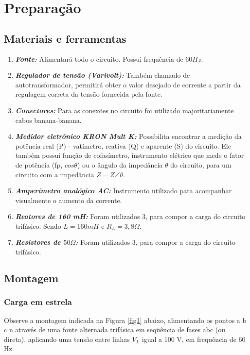 \documentclass[a4paper,12pt,oneside,openany,table,xcdraw]{article}
\begin{document}
\section{Preparação}
\subsection{Materiais e ferramentas} %
\begin{enumerate}[1 -]
\item \emph{\textbf{Fonte:}}
Alimentará todo o circuito. Possui frequência de $60Hz$.

\item \emph{\textbf{Regulador de tensão (Varivolt):}}
Também chamado de autotransformador, permitirá obter o valor desejado de corrente a partir da regulagem correta da tensão fornecida pela fonte.

\item \emph{\textbf{Conectores:}}
Para as conexões no circuito foi utilizado majoritariamente cabos banana-banana.

\item \emph{\textbf{Medidor eletrônico KRON Mult K:}}
Possibilita encontrar a medição da potência real (P) - vatímetro, reativa (Q) e aparente (S) do circuito. Ele também possui função de cofasímetro, instrumento elétrico que mede o fator de potência (fp, $cos\theta$) ou o ângulo da impedância $\theta$ do circuito, para um circuito com a impedância $Z = Z\angle \theta$.

\item \emph{\textbf{Amperímetro analógico AC:}}
Instrumento utilizado para acompanhar visualmente o aumento da corrente.

\item \emph{\textbf{Reatores de 160 mH:}}
Foram utilizados 3, para compor a carga do circuito trifásico. Sendo $L=160mH$ e $R_L=3,8\Omega$.

\item \emph{\textbf{Resistores de $50\Omega$:}}
Foram utilizados 3, para compor a carga do circuito trifásico.
\end{enumerate}

\subsection{Montagem} %

\subsubsection{Carga em estrela}
Observe a montagem indicada na Figura \ref{fig1} abaixo, alimentando os pontos a b c n através de uma fonte alternada trifásica em seqüência de fases abc (ou direta), aplicando uma tensão entre linhas $V_L$ igual a 100 V, em frequência de 60 Hz.
\end{document}
